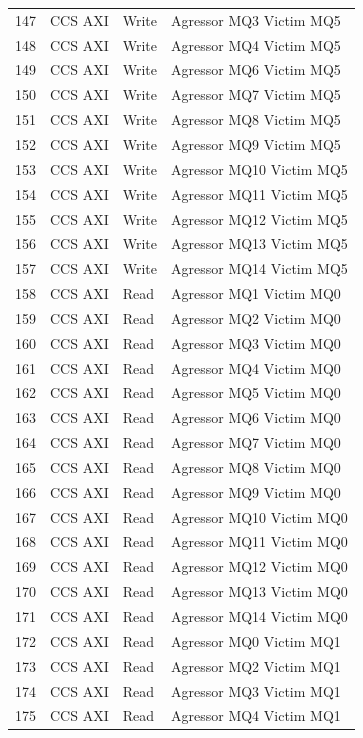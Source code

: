 \begin{center}
\begin{longtable}{|l|l|l|l|}
147 & CCS AXI & Write &  Agressor MQ3 Victim MQ5\\
148 & CCS AXI & Write &  Agressor MQ4 Victim MQ5\\
149 & CCS AXI & Write &  Agressor MQ6 Victim MQ5\\
150 & CCS AXI & Write &  Agressor MQ7 Victim MQ5\\
151 & CCS AXI & Write &  Agressor MQ8 Victim MQ5\\
152 & CCS AXI & Write &  Agressor MQ9 Victim MQ5\\
153 & CCS AXI & Write &  Agressor MQ10 Victim MQ5\\
154 & CCS AXI & Write &  Agressor MQ11 Victim MQ5\\
155 & CCS AXI & Write &  Agressor MQ12 Victim MQ5\\
156 & CCS AXI & Write &  Agressor MQ13 Victim MQ5\\
157 & CCS AXI & Write &  Agressor MQ14 Victim MQ5\\
158 & CCS AXI & Read &  Agressor MQ1 Victim MQ0\\
159 & CCS AXI & Read &  Agressor MQ2 Victim MQ0\\
160 & CCS AXI & Read &  Agressor MQ3 Victim MQ0\\
161 & CCS AXI & Read &  Agressor MQ4 Victim MQ0\\
162 & CCS AXI & Read &  Agressor MQ5 Victim MQ0\\
163 & CCS AXI & Read &  Agressor MQ6 Victim MQ0\\
164 & CCS AXI & Read &  Agressor MQ7 Victim MQ0\\
165 & CCS AXI & Read &  Agressor MQ8 Victim MQ0\\
166 & CCS AXI & Read &  Agressor MQ9 Victim MQ0\\
167 & CCS AXI & Read &  Agressor MQ10 Victim MQ0\\
168 & CCS AXI & Read &  Agressor MQ11 Victim MQ0\\
169 & CCS AXI & Read &  Agressor MQ12 Victim MQ0\\
170 & CCS AXI & Read &  Agressor MQ13 Victim MQ0\\
171 & CCS AXI & Read &  Agressor MQ14 Victim MQ0\\
172 & CCS AXI & Read &  Agressor MQ0 Victim MQ1\\
173 & CCS AXI & Read &  Agressor MQ2 Victim MQ1\\
174 & CCS AXI & Read &  Agressor MQ3 Victim MQ1\\
175 & CCS AXI & Read &  Agressor MQ4 Victim MQ1\\

\end{longtable}
\end{center}
